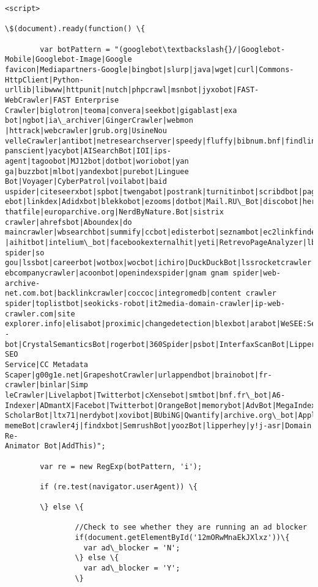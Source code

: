 \documentclass[11pt]{article}
\begin{document}
\begin{Verbatim}[commandchars=\\\{\}]
<script>

\$(document).ready(function() \{

        var botPattern = "(googlebot\textbackslash{}/|Googlebot-Mobile|Googlebot-Image|Google
favicon|Mediapartners-Google|bingbot|slurp|java|wget|curl|Commons-
HttpClient|Python-urllib|libwww|httpunit|nutch|phpcrawl|msnbot|jyxobot|FAST-
WebCrawler|FAST Enterprise Crawler|biglotron|teoma|convera|seekbot|gigablast|exa
bot|ngbot|ia\_archiver|GingerCrawler|webmon |httrack|webcrawler|grub.org|UsineNou
velleCrawler|antibot|netresearchserver|speedy|fluffy|bibnum.bnf|findlink|msrbot|
panscient|yacybot|AISearchBot|IOI|ips-agent|tagoobot|MJ12bot|dotbot|woriobot|yan
ga|buzzbot|mlbot|yandexbot|purebot|Linguee Bot|Voyager|CyberPatrol|voilabot|baid
uspider|citeseerxbot|spbot|twengabot|postrank|turnitinbot|scribdbot|page2rss|sit
ebot|linkdex|Adidxbot|blekkobot|ezooms|dotbot|Mail.RU\_Bot|discobot|heritrix|find
thatfile|europarchive.org|NerdByNature.Bot|sistrix crawler|ahrefsbot|Aboundex|do
maincrawler|wbsearchbot|summify|ccbot|edisterbot|seznambot|ec2linkfinder|gslfbot
|aihitbot|intelium\_bot|facebookexternalhit|yeti|RetrevoPageAnalyzer|lb-spider|so
gou|lssbot|careerbot|wotbox|wocbot|ichiro|DuckDuckBot|lssrocketcrawler|drupact|w
ebcompanycrawler|acoonbot|openindexspider|gnam gnam spider|web-archive-
net.com.bot|backlinkcrawler|coccoc|integromedb|content crawler
spider|toplistbot|seokicks-robot|it2media-domain-crawler|ip-web-crawler.com|site
explorer.info|elisabot|proximic|changedetection|blexbot|arabot|WeSEE:Search|niki
-bot|CrystalSemanticsBot|rogerbot|360Spider|psbot|InterfaxScanBot|Lipperhey SEO
Service|CC Metadata
Scaper|g00g1e.net|GrapeshotCrawler|urlappendbot|brainobot|fr-crawler|binlar|Simp
leCrawler|Livelapbot|Twitterbot|cXensebot|smtbot|bnf.fr\_bot|A6-
Indexer|ADmantX|Facebot|Twitterbot|OrangeBot|memorybot|AdvBot|MegaIndex|Semantic
ScholarBot|ltx71|nerdybot|xovibot|BUbiNG|Qwantify|archive.org\_bot|Applebot|Tweet
memeBot|crawler4j|findxbot|SemrushBot|yoozBot|lipperhey|y!j-asr|Domain Re-
Animator Bot|AddThis)";

        var re = new RegExp(botPattern, 'i');

        if (re.test(navigator.userAgent)) \{

        \} else \{

                //Check to see whether they are running an ad blocker
                if(document.getElementById('12mORwMnaEkJXlxz'))\{
                  var ad\_blocker = 'N';
                \} else \{
                  var ad\_blocker = 'Y';
                \}


\end{Verbatim}
\end{document}
